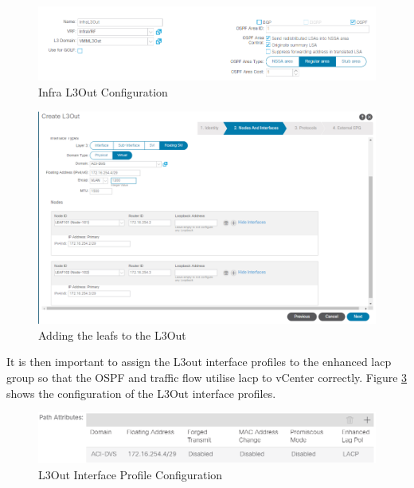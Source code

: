 \begin{figure}[H]

    \centering
    \includegraphics[scale=0.6]{images/InfraL3Out.png}

    \caption{Infra L3Out Configuration}
    \label{fig:l3out}
\end{figure}

\begin{figure}[H]

    \centering
    \includegraphics[scale=0.47]{images/InfraL3OutNodes.png}

    \caption{Adding the leafs to the L3Out}
    \label{fig:l3out-nodes}
\end{figure}

It is then important to assign the L3out interface profiles to the enhanced \gls{lacp} group so that the OSPF and traffic flow utilise \gls{lacp} to vCenter correctly. Figure \ref{fig:l3out-lacp} shows the configuration of the L3Out interface profiles.

\begin{figure}[H]

    \centering
    \includegraphics[scale=0.8]{images/l3out-lacp.png}

    \caption{L3Out Interface Profile Configuration}
    \label{fig:l3out-lacp}
\end{figure}


